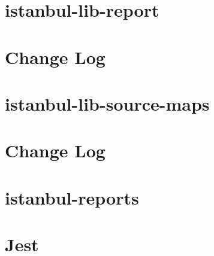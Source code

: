 \documentclass[twoside]{book}
\newcommand{\+}{\discretionary{\mbox{\scriptsize$\hookleftarrow$}}{}{}}
\begin{document}
\chapter{istanbul-\/lib-\/report}
\label{md__c_1_workspace_demo_src_main_script_node_modules_istanbul-lib-report__r_e_a_d_m_e}

\chapter{Change Log}
\label{md__c_1_workspace_demo_src_main_script_node_modules_istanbul-lib-source-maps__c_h_a_n_g_e_l_o_g}

\chapter{istanbul-\/lib-\/source-\/maps}
\label{md__c_1_workspace_demo_src_main_script_node_modules_istanbul-lib-source-maps__r_e_a_d_m_e}

\chapter{Change Log}
\label{md__c_1_workspace_demo_src_main_script_node_modules_istanbul-reports__c_h_a_n_g_e_l_o_g}

\chapter{istanbul-\/reports}
\label{md__c_1_workspace_demo_src_main_script_node_modules_istanbul-reports__r_e_a_d_m_e}

\chapter{Jest}
\label{md__c_1_workspace_demo_src_main_script_node_modules_jest__r_e_a_d_m_e}

\end{document}

